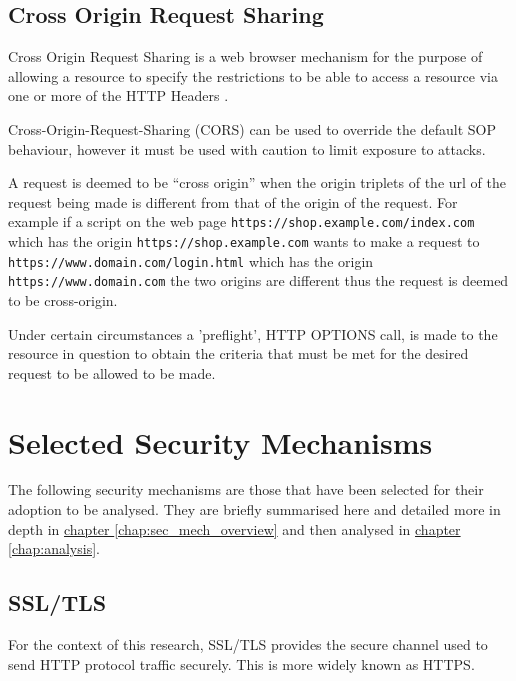 \documentclass{mscreport}
\begin{document}
\subsection{Cross Origin Request Sharing}
\label{section:Cross-Origin-Request-Sharing}

\noindent
Cross Origin Request Sharing is a web browser mechanism for the purpose of allowing a resource to specify the restrictions to be able to access a resource via one or more of the HTTP Headers \cite{Apple2006-hk}.

\vspace{0.3cm} \noindent
Cross-Origin-Request-Sharing (CORS) can be used to override the default SOP behaviour, however it must be used with caution to limit exposure to attacks.

\vspace{0.3cm} \noindent
A request is deemed to be ``cross origin'' when the origin triplets of the url of the request being made is different from that of the origin of the request. For example if a script on the web page \texttt{https://shop.example.com/index.com} which has the origin \texttt{https://shop.example.com} wants to make a request to \texttt{https://www.domain.com/login.html} which has the origin \texttt{https://www.domain.com} the two origins are different thus the request is deemed to be cross-origin.

\vspace{0.3cm} \noindent
Under certain circumstances a 'preflight', HTTP OPTIONS call, is made to the resource in question to obtain the criteria that must be met for the desired request to be allowed to be made.

\newpage

\section{Selected Security Mechanisms}
\label{section:selected_security_mechanisms}

The following security mechanisms are those that have been selected for their adoption to be analysed. They are briefly summarised here and detailed more in depth in \hyperref[chap:sec_mech_overview]{chapter \ref{chap:sec_mech_overview}} and then analysed in \hyperref[chap:analysis]{chapter \ref{chap:analysis}}.


\subsection{SSL/TLS}
\label{section:ssm_tls}
For the context of this research, SSL/TLS provides the secure channel used to send HTTP protocol traffic securely. This is more widely known as HTTPS.
\end{document}

